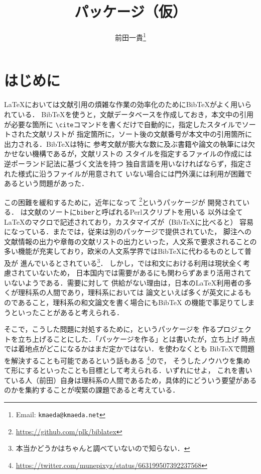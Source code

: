 \documentclass[lualatex,ja=standard,magstyle=real]{bxjsarticle}
\title{\bfseries\spotcolor\sty{biblatex-japanese}パッケージ（仮）}
\author{前田一貴\footnote{Email: \texttt{kmaeda@kmaeda.net}}}
\begin{document}
\maketitle

\tableofcontents

\section{はじめに}
\LaTeX{}においては文献引用の煩雑な作業の効率化のためにBib\TeX{}がよく用いられている．
Bib\TeX{}を使うと，文献データベースを作成しておき，本文中の引用が必要な箇所に
\verb+\cite+コマンドを書くだけで自動的に，指定したスタイルでソートされた文献リストが
指定箇所に，ソート後の文献番号が本文中の引用箇所に出力される．Bib\TeX{}は特に
参考文献が膨大な数に及ぶ書籍や論文の執筆には欠かせない機構であるが，文献リストの
スタイルを指定するファイルの作成には逆ポーランド記法に基づく文法を持つ
独自言語を用いなければならず，指定された様式に沿うファイルが用意されて
いない場合には門外漢には利用が困難であるという問題があった．

この困難を緩和するために，近年になって
\footnote{\url{https://github.com/plk/biblatex}}というパッケージが
開発されている．
は文献のソートに\texttt{biber}と呼ばれるPerlスクリプトを用いる
以外は全て\LaTeX{}のマクロで記述されており，カスタマイズが（Bib\TeX{}に比べると）
容易になっている．またでは，従来は別のパッケージで提供されていた，
脚注への文献情報の出力や章毎の文献リストの出力といった，人文系で要求されることの
多い機能が充実しており，欧米の人文系学界ではBib\TeX{}に代わるものとして普及が
進んでいるとされている\footnote{本当かどうかはちゃんと調べていないので知らない．}．
しかし，では和文における利用は現状全く考慮されていないため，
日本国内では需要があるにも関わらずあまり活用されていないようである．需要に対して
供給がない理由は，日本の\LaTeX{}利用者の多くが理科系の人間であり，理科系においては
論文といえば多くが英文によるものであること，理科系の和文論文を書く場合にもBib\TeX{}
の機能で事足りてしまうといったことがあると考えられる．

そこで，こうした問題に対処するために，というパッケージを
作るプロジェクトを立ち上げることにした．「パッケージを作る」とは書いたが，立ち上げ
時点では着地点がどこになるかはまだ定かではない．を使わなくとも
Bib\TeX{}で問題を解決することも可能であるという話もある
\footnote{\url{https://twitter.com/munepixyz/status/663199507392237568}}ので，
そうしたノウハウを集めて形にするといったことも目標として考えられる．いずれにせよ，
これを書いている人（前田）自身は理科系の人間であるため，具体的にどういう要望がある
のかを集約することが喫緊の課題であると考えている．
\end{document}
